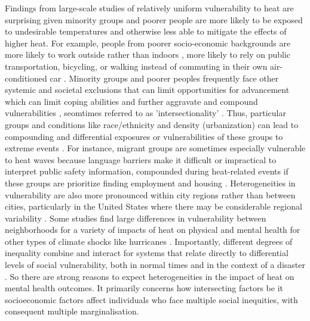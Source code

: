 \documentclass[fleqn,10pt]{wlscirep}
\begin{document}
Findings from large-scale studies of relatively uniform vulnerability to heat are surprising given minority groups and poorer people are more likely to be exposed to undesirable temperatures and otherwise less able to mitigate the effects of higher heat. For example, people from poorer socio-economic backgrounds are more likely to work outside rather than indoors \cite{Gubernot2014Oct}, more likely to rely on public transportation, bicycling, or walking instead of commuting in their own air-conditioned car \cite{Karner2015Dec}. Minority groups and poorer peoples frequently face other systemic and societal exclusions that can limit opportunities for advancement which can limit coping abilities and further aggravate and compound vulnerabilities \cite{hallegatte2016shock}, seomtimes referred to as 'intersectionality' \cite{Kuran2020Nov}. Thus, particular groups and conditions like race/ethnicity and density (urbanization) can lead to compounding and differential exposures or vulnerabilities of these groups to extreme events \cite{Cardona2012Jan}. For instance, migrant groups are sometimes especially vulnerable to heat waves because language barriers make it difficult or impractical to interpret public safety information, compounded during heat-related events if these groups are prioritize finding employment and housing \cite{Thomas2019Mar}. Heterogeneities in vulnerability are also more pronounced within city regions rather than between cities, particularly in the United States where there may be considerable regional variability \cite{Cardona2012Jan}. Some studies find large differences in vulnerability between neighborhoods for a variety of impacts of heat on physical \cite{Belanger2015Mar, Uejio2011Mar} and mental health for other types of climate shocks like hurricanes \cite{ferre2019hurricane, Gruebner2015Jun}. Importantly, different degrees of inequality combine and interact for systems that relate directly to differential levels of social vulnerability, both in normal times and in the context of a disaster \cite{Kuran2020Nov}. So there are strong reasons to expect heterogeneities in the impact of heat on mental health outcomes. It primarily concerns how intersecting factors be it socioeconomic factors affect individuals who face multiple social inequities, with consequent multiple marginalisation. 
\end{document}
